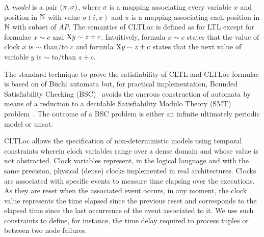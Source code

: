 A \textit{model} is a pair $(\pi, \sigma)$, where $\sigma$ is a mapping associating every variable $x$ and position in $\mathbb{N}$ with value $\sigma(i,x)$ and $\pi$ is a mapping associating each position in $\mathbb{N}$ with subset of $AP$. 
The semantics of CLTLoc is defined as for LTL except for formulae $x\sim c$ and $\mathrm{X} y \sim z\pm c$. 
Intuitively, formula $x\sim c$ states that the value of clock $x$ is $\sim$ than/to $c$ and formula $\mathrm{X} y \sim z\pm c$ states that the next value of variable $y$ is $\sim$ to/than $z+c$.

The standard technique to prove the satisfiability of CLTL and CLTLoc formulae is based on of B\"uchi automata \cite{DD07,BRS15} %
but, for practical implementation, Bounded Satisfiability Checking (BSC)~\cite{MPS13} avoids the onerous construction of automata by means of a reduction to a decidable Satisfiability Modulo Theory (SMT) problem~\cite{BRS15}.
The outcome of a BSC problem is either an infinite ultimately periodic model or unsat.

CLTLoc allows the specification of non-deterministic models using temporal constraints wherein clock variables range over a dense domain and whose value is not abstracted.
Clock variables represent, in the logical language and with the same precision, physical (dense) clocks implemented in real architectures.
Clocks are associated with specific events to measure time elapsing over the executions.
As they are reset when the associated event occurs, in any moment, the clock value represents the time elapsed since the previous reset and corresponds to the elapsed time since the last occurrence of the event associated to it.
We use such constraints to define, for instance, the time delay required to process tuples or between two node failures.\\






